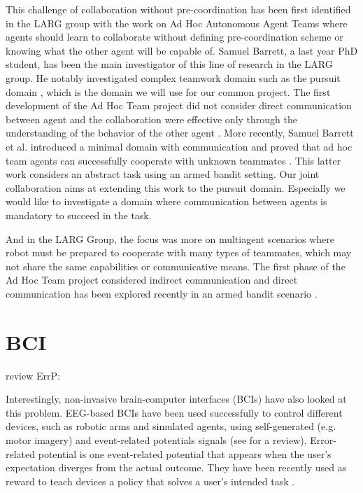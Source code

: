 This challenge of collaboration without pre-coordination has been first identified in the LARG group with the work on Ad Hoc Autonomous Agent Teams \cite{stone2010ad} where agents should learn to collaborate without defining pre-coordination scheme or knowing what the other agent will be capable of. Samuel Barrett, a last year PhD student, has been the main investigator of this line of research in the LARG group. He notably investigated complex teamwork domain such as the pursuit domain \cite{barrett2011empirical}, which is the domain we will use for our common project. The first development of the Ad Hoc Team project did not consider direct communication between agent \cite{stone2010ad} \cite{barrett2011adhoc} and the collaboration were effective only through the understanding of the behavior of the other agent \cite{barrett2011empirical} \cite{barrett2013team}. More recently, Samuel Barrett et al. introduced a minimal domain with communication and proved that ad hoc team agents can successfully cooperate with unknown teammates \cite{barrett2013communicating}. This latter work considers an abstract task using an armed bandit setting. Our joint collaboration aims at extending this work to the pursuit domain. Especially we would like to investigate a domain where communication between agents is mandatory to succeed in the task. 

And in the LARG Group, the focus was more on multiagent scenarios where robot must be prepared to cooperate with many types of teammates, which may not share the same capabilities or communicative means. The first phase of the Ad Hoc Team project considered indirect communication \cite{stone2010ad} \cite{barrett2011empirical} \cite{barrett2011adhoc} \cite{barrett2013team} and direct communication has been explored recently in an armed bandit scenario \cite{barrett2013communicating}.

\section{BCI}

review ErrP: \cite{chavarriaga2014errare}

Interestingly, non-invasive brain-computer interfaces (BCIs) have also looked at this problem. EEG-based BCIs have been used successfully to control different devices, such as robotic arms and simulated agents, using self-generated (e.g. motor imagery) and event-related potentials signals (see \cite{millan10} for a review). 
%
Error-related potential is one event-related potential that appears when the user's expectation diverges from the actual outcome. They have been recently used as reward to teach devices a policy that solves a user's intended task \cite{chavarriaga2010learning,iturrate2010robot}.

